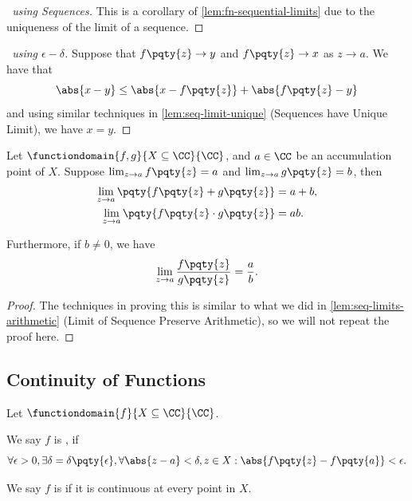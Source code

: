 \begin{proof}[\proofname\ using Sequences]
    This is a corollary of \autoref{lem:fn-sequential-limits} due to the uniqueness of the limit of a sequence.
\end{proof}

\begin{proof}[\proofname\ using \(\epsilon-\delta\)]
    Suppose that \(f\pqty{z} \to y\) and \(f\pqty{z} \to x\) as \(z \to a\). We have that
    \[
        \abs{x - y} \leq \abs{x - f\pqty{z}} + \abs{f\pqty{z} - y}
    \]
    and using similar techniques in \autoref{lem:seq-limit-unique} (Sequences have Unique Limit), we have \(x = y\).
\end{proof}

\begin{lemma}
    \label{lem:fn-limits-preserve-arithmetic}%
    Let \(\functiondomain{f, g}{X \subseteq \CC}{\CC}\), and \(a \in \CC\) be an accumulation point of \(X\). Suppose \(\lim_{z \to a} f\pqty{z} = a\) and \(\lim_{z \to a} g\pqty{z} = b\), then
    \begin{align*}
        \lim_{z \to a} \pqty{f\pqty{z} + g\pqty{z}} &= a + b, \\
        \lim_{z \to a} \pqty{f\pqty{z} \cdot g\pqty{z}} & = ab.
    \end{align*}

    Furthermore, if \(b \neq 0\), we have
    \[
        \lim_{z \to a} \frac{f\pqty{z}}{g\pqty{z}} = \frac{a}{b}.
    \]
\end{lemma}

\begin{proof}
    The techniques in proving this is similar to what we did in \autoref{lem:seq-limits-arithmetic} (Limit of Sequence Preserve Arithmetic), so we will not repeat the proof here.
\end{proof}

\subsection{Continuity of Functions}

\begin{definition}[Continuity]
    \label{def:fn-continuity}%
    Let \(\functiondomain{f}{X \subseteq \CC}{\CC}\).

    We say \(f\) is , if
    \[
        \forall \epsilon > 0, \exists \delta = \delta\pqty{\epsilon}, \forall \abs{z - a} < \delta, z \in X: \abs{f\pqty{z} - f\pqty{a}} < \epsilon.
    \]

    
    
    We say \(f\) is  if it is continuous at every point in \(X\).    
\end{definition}

